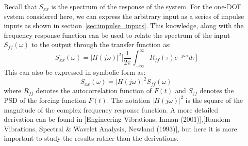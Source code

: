 \documentclass[12pt,letter]{article}
\begin{document}
Recall that $S_{xx}$ is the spectrum of the response of the system. For the one-DOF system considered here, we can express the arbitrary input as a series of impulse inputs as shown in section~\ref{sec:impulse_inputs}. This knowledge, along with the frequency response function can be used to relate the spectrum of the input $S_{ff}(\omega)$ to the output through the transfer function as:
\begin{equation}
S_{xx}(\omega) =  |H(j\omega)|^2\Bigg[\frac{1}{2 \pi } \int_{-\infty}^{\infty} R_{ff}(\tau) e^{-j \omega \tau}d  \tau  \Bigg] 
\end{equation}
This can also be expressed in symbolic form as:
\begin{equation}
S_{xx}(\omega) =  |H(j\omega)|^2 S_{ff}(\omega)
\end{equation}
where $R_{ff}$ denotes the autocorrelation function of $F(t)$ and $S_{ff}$ denotes the PSD of the forcing function $F(t)$. The notation $|H(j\omega)|^2$ is the square of the magnitude of the complex frequency response function. A more detailed derivation can be found in [Engineering Vibrations, Inman (2001)],[Random Vibrations, Spectral \& Wavelet Analysis, Newland (1993)], but here it is more important to study the results rather than the derivations. 
\end{document}
